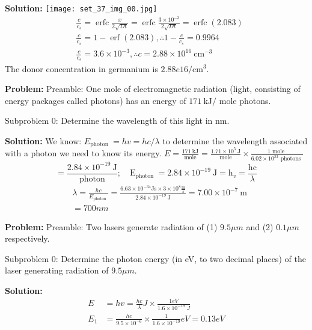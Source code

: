 \documentclass[10pt]{article}
\begin{document}
\textbf{Solution:}
\texttt{[image: set\_37\_img\_00.jpg]}
\nonessentialimage
\[
\begin{aligned}
&\frac{c}{c_{s}}=\operatorname{erfc} \frac{x}{2 \sqrt{D t}}=\operatorname{erfc} \frac{3 \times 10^{-3}}{2 \sqrt{D t}}=\operatorname{erfc}(2.083) \\
&\frac{c}{c_{s}}=1-\operatorname{erf}(2.083), \therefore 1-\frac{c}{c_{s}}=0.9964 \\
&\frac{c}{c_{s}}=3.6 \times 10^{-3}, \therefore c=2.88 \times 10^{16} \mathrm{~cm}^{-3}
\end{aligned}
\]
The donor concentration in germanium is $\boxed{2.88e16} / \mathrm{cm}^{3}$.


\textbf{Problem:}
Preamble: One mole of electromagnetic radiation (light, consisting of energy packages called photons) has an energy of $171 \mathrm{~kJ} /$ mole photons.

Subproblem 0: Determine the wavelength of this light in nm. 


\textbf{Solution:}
We know: $E_{\text {photon }}=h v=h c / \lambda$ to determine the wavelength associated with a photon we need to know its energy. $E=\frac{171 \mathrm{~kJ}}{\text { mole }}=\frac{1.71 \times 10^{5} \mathrm{~J}}{\text { mole }} \times \frac{1 \text { mole }}{6.02 \times 10^{23} \text { photons }}$
\[
=\frac{2.84 \times 10^{-19} \mathrm{~J}}{\text { photon }} ; \quad \mathrm{E}_{\text {photon }}=2.84 \times 10^{-19} \mathrm{~J}=\mathrm{h}_{v}=\frac{\mathrm{hc}}{\lambda}
\]
\[
\begin{aligned}
& \lambda=\frac{h c}{E_{\text {photon }}}=\frac{6.63 \times 10^{-34} \mathrm{Js} \times 3 \times 10^{8} \frac{\mathrm{m}}{\mathrm{s}}}{2.84 \times 10^{-19} \mathrm{~J}}=7.00 \times 10^{-7} \mathrm{~m} \\
& =\boxed{700} nm
\end{aligned}
\]


\textbf{Problem:}
Preamble: Two lasers generate radiation of (1) $9.5 \mu {m}$ and (2) $0.1 \mu {m}$ respectively.

Subproblem 0: Determine the photon energy (in eV, to two decimal places) of the laser generating radiation of $9.5 \mu {m}$.


\textbf{Solution:}
\[
\begin{aligned}
{E} &={h} v=\frac{{hc}}{\lambda} {J} \times \frac{1 {eV}}{1.6 \times 10^{-19} {~J}} \\
{E}_{1} &=\frac{{hc}}{9.5 \times 10^{-6}} \times \frac{1}{1.6 \times 10^{-19}} {eV}= \boxed{0.13} {eV}
\end{aligned}
\]
\end{document}
